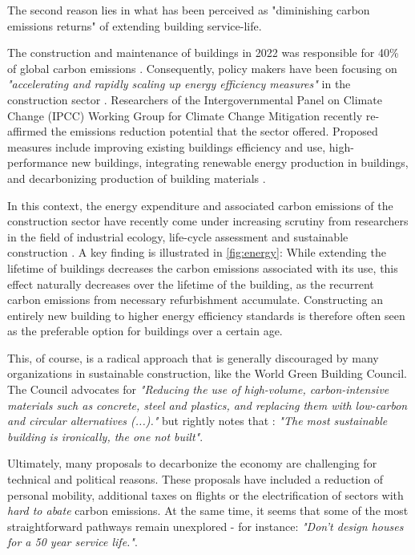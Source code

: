 \documentclass{article}
\begin{document}
\clearpage
\begin{multicols}{2}

The second reason lies in what has been perceived as "diminishing carbon emissions returns" of extending building service-life.

The construction and maintenance of buildings in 2022 was responsible for 40\% of global carbon emissions \cite{camarasa_energy_2023}. Consequently, policy makers have been focusing on \textit{"accelerating and rapidly scaling up energy efficiency measures"} in the construction sector \cite{noauthor_2022_2022}. Researchers of the Intergovernmental Panel on Climate Change (IPCC) Working Group for Climate Change Mitigation recently re-affirmed the emissions reduction potential that the sector offered. Proposed measures include improving existing buildings efficiency and use, high-performance new buildings, integrating renewable energy production in buildings, and decarbonizing production of building materials \cite{shukla_mitigation_2022}.

In this context, the energy expenditure and associated carbon emissions of the construction sector have recently come under increasing scrutiny from researchers in the field of industrial ecology, life-cycle assessment and sustainable construction \cite{chau_review_2015}\cite{ortiz_sustainability_2009}. A key finding is illustrated in \cref{fig:energy}: While extending the lifetime of buildings decreases the carbon emissions associated with its use, this effect naturally decreases over the lifetime of the building, as the recurrent carbon emissions from necessary refurbishment accumulate. Constructing an entirely new building to higher energy efficiency standards is therefore often seen as the preferable option for buildings over a certain age.

This, of course, is a radical approach that is generally discouraged by many organizations in sustainable construction, like the World Green Building Council. The Council advocates for \textit{"Reducing the use of high-volume, carbon-intensive materials such as concrete, steel and plastics, and replacing them with low-carbon and circular alternatives (...)."} \cite[Sec. 7.4]{noauthor_2022_2022} but rightly notes that : \textit{"The most sustainable building is ironically, the one not built"}.

Ultimately, many proposals to decarbonize the economy are challenging for technical and political reasons. These proposals have included a reduction of personal mobility, additional taxes on flights or the electrification of sectors with \textit{hard to abate} carbon emissions. At the same time, it seems that some of the most straightforward pathways remain unexplored - for instance: \textit{"Don't design houses for a 50 year service life."}.

\end{multicols}
\end{document}
